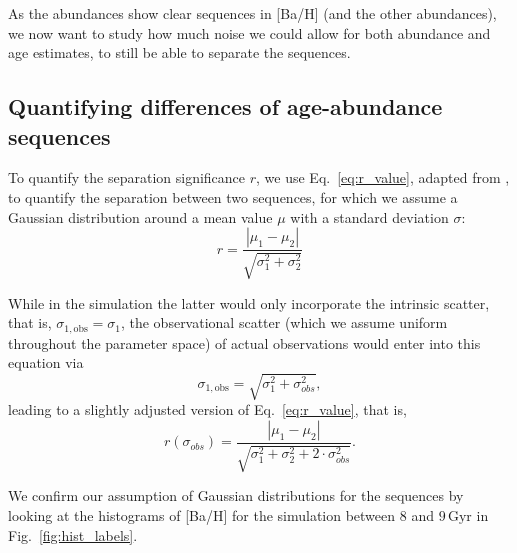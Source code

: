 \documentclass[fleqn,usenatbib]{mnras}
\begin{document}
As the abundances show clear sequences in [Ba/H] (and the other abundances), we now want to study how much noise we could allow for both abundance and age estimates, to still be able to separate the sequences.

\subsection{Quantifying differences of age-abundance sequences} \label{sec:ageabundance}

To quantify the separation significance $r$, we use Eq.~\ref{eq:r_value}, adapted from \citet{Lindegren2013}, to quantify the separation between two sequences, for which we assume a Gaussian distribution around a mean value $\mu$ with a standard deviation $\sigma$:
\begin{equation} \label{eq:r_value}
r = \frac{|\mu_1 - \mu_2|}{\sqrt{\sigma_1^2 + \sigma_2^2}}
\end{equation}

While in the simulation the latter would only incorporate the intrinsic scatter, that is, $\sigma_{1,\text{obs}} = \sigma_1$, the observational scatter (which we assume uniform throughout the parameter space) of actual observations would enter into this equation via
\begin{equation} \label{eq:scatter}
    \sigma_{1,\text{obs}} = \sqrt{\sigma_1^2+\sigma_{obs}^2},
\end{equation}
leading to a slightly adjusted version of Eq.~\ref{eq:r_value}, that is,
\begin{equation} \label{eq:r_value_observed}
r (\sigma_{obs}) = \frac{|\mu_1 - \mu_2|}{\sqrt{\sigma_1^2 + \sigma_2^2 + 2\cdot \sigma_{obs}^2}}.
\end{equation}

We confirm our assumption of Gaussian distributions for the sequences by looking at the histograms of [Ba/H] for the simulation between 8 and $9\,\mathrm{Gyr}$ in Fig.~\ref{fig:hist_labels}.
\end{document}
